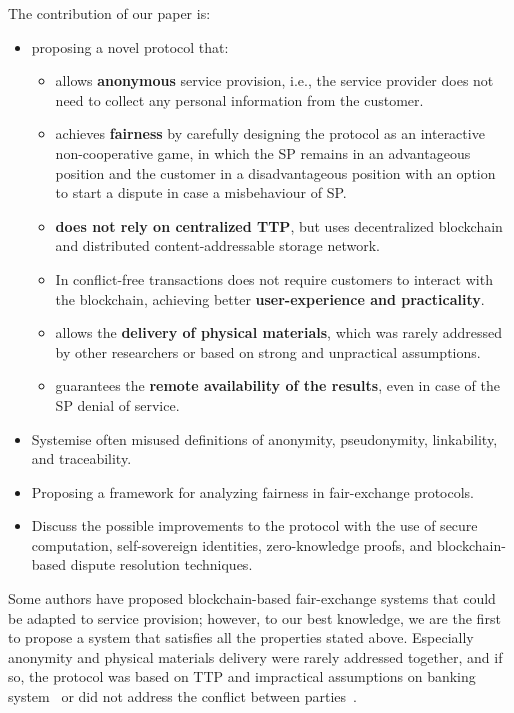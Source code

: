 The contribution of our paper is:
\begin{itemize}
\item proposing a novel protocol that:
  \begin{itemize}
  \item allows \textbf{anonymous} service provision, i.e., the service provider does not need to collect any personal information from the customer.
  \item achieves \textbf{fairness} by carefully designing the protocol as an interactive non-cooperative game, in which the SP remains in an advantageous position and the customer in a disadvantageous position with an option to start a dispute in case a misbehaviour of SP.
  \item \textbf{does not rely on centralized TTP}, but uses decentralized blockchain and distributed content-addressable storage network.
  \item In conflict-free transactions does not require customers to interact with the blockchain, achieving better \textbf{user-experience and practicality}.
  \item allows the \textbf{delivery of physical materials}, which was rarely addressed by other researchers or based on strong and unpractical assumptions.
  \item guarantees the \textbf{remote availability of the results}, even in case of the SP denial of service.
  \end{itemize} 
\item Systemise often misused definitions of anonymity, pseudonymity, linkability, and traceability.
\item Proposing a framework for analyzing fairness in fair-exchange protocols.
\item Discuss the possible improvements to the protocol with the use of secure computation, self-sovereign identities, zero-knowledge proofs, and blockchain-based dispute resolution techniques.
\end{itemize} 

Some authors have proposed blockchain-based fair-exchange systems that could be adapted to service provision; however, to our best knowledge, we are the first to propose a system that satisfies all the properties stated above. Especially anonymity and physical materials delivery were rarely addressed together, and if so, the protocol was based on TTP and impractical assumptions on banking system~\cite{birjoveanuAnonymityFairexchangeEcommerce2015} or did not address the conflict between parties~\cite{altawyLelantosBlockchainBasedAnonymous2017}.


